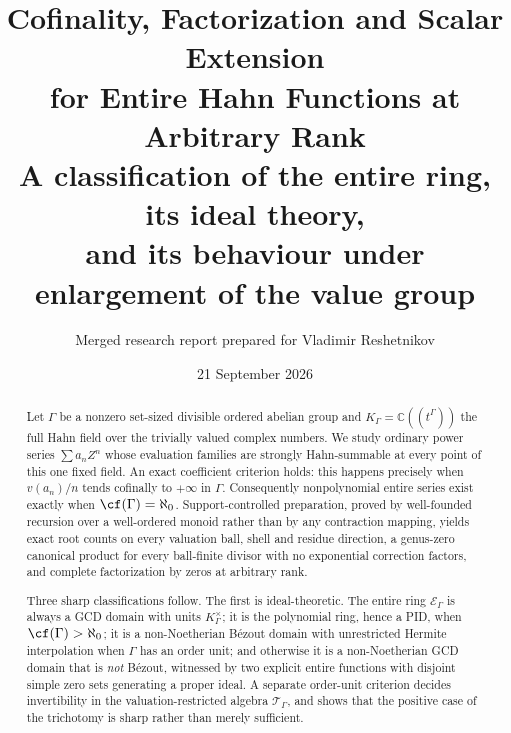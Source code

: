 \documentclass[11pt]{article}
\title{\textbf{Cofinality, Factorization and Scalar Extension\\
for Entire Hahn Functions at Arbitrary Rank}\\[5pt]
\large A classification of the entire ring, its ideal theory,\\
and its behaviour under enlargement of the value group}
\author{Merged research report prepared for Vladimir Reshetnikov}
\date{21 September 2026}
\theoremstyle{plain}
\theoremstyle{plain}
\theoremstyle{plain}
\theoremstyle{definition}
\theoremstyle{definition}
\theoremstyle{definition}
\theoremstyle{definition}
\theoremstyle{remark}
\newcommand{\C}{\mathbb C}\newcommand{\R}{\mathbb R}
\newcommand{\K}{K_\Gamma}\newcommand{\KD}{K_\Delta}
\newcommand{\E}{\mathcal E_\Gamma}
\newcommand{\TT}{\mathcal T_\Gamma}
\begin{document}
\maketitle
\begin{abstract}
Let $\Gamma$ be a nonzero set-sized divisible ordered abelian group and
$\K=\C((t^\Gamma))$ the full Hahn field over the trivially valued complex
numbers. We study ordinary power series $\sum a_nZ^n$ whose evaluation
families are strongly Hahn-summable at every point of this one fixed
field. An exact coefficient criterion holds: this happens precisely when
$v(a_n)/n$ tends cofinally to $+\infty$ in $\Gamma$. Consequently
nonpolynomial entire series exist exactly when $\cf(\Gamma)=\aleph_0$.
Support-controlled preparation, proved by well-founded recursion over a
well-ordered monoid rather than by any contraction mapping, yields exact
root counts on every valuation ball, shell and residue direction, a
genus-zero canonical product for every ball-finite divisor with no
exponential correction factors, and complete factorization by zeros at
arbitrary rank.

Three sharp classifications follow. The first is ideal-theoretic. The entire
ring $\E$ is always a GCD domain with units $\K^\times$; it is the
polynomial ring, hence a PID, when $\cf(\Gamma)>\aleph_0$; it is a
non-Noetherian B\'ezout domain with unrestricted Hermite interpolation when
$\Gamma$ has an order unit; and otherwise it is a non-Noetherian GCD domain
that is \emph{not} B\'ezout, witnessed by two explicit entire functions with
disjoint simple zero sets generating a proper ideal. A separate order-unit
criterion decides invertibility in the valuation-restricted algebra
$\TT$, and shows that the positive case of the trichotomy is sharp rather
than merely sufficient.


\end{abstract}
\end{document}
